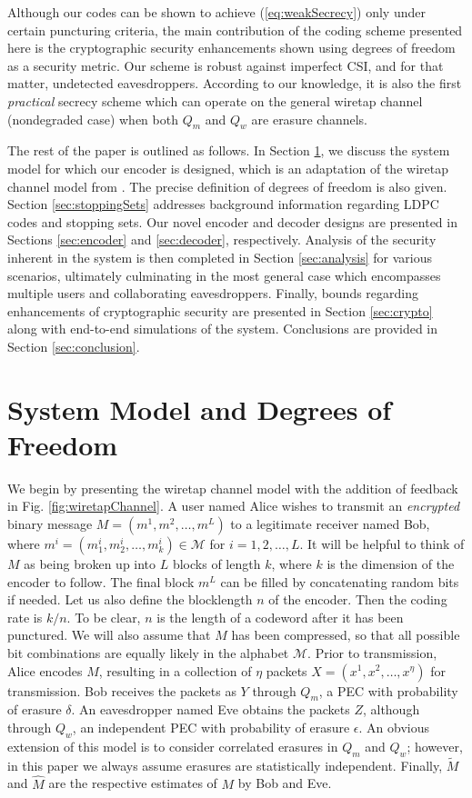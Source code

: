 \documentclass[10pt,twocolumn,twoside]{IEEEtran} \newlength{\pic}
\theoremstyle{definition}
\theoremstyle{remark}
\theoremstyle{plain}
\begin{document}
Although our codes can be shown to achieve (\ref{eq:weakSecrecy}) only under certain puncturing criteria, the main contribution of the coding scheme presented here is the cryptographic security enhancements shown using degrees of freedom as a security metric. Our scheme is robust against imperfect CSI, and for that matter, undetected eavesdroppers. According to our knowledge, it is also the first \emph{practical} secrecy scheme which can operate on the general wiretap channel (nondegraded case) when both $Q_m$ and $Q_w$ are erasure channels.

The rest of the paper is outlined as follows. In Section \ref{sec:system}, we discuss the system model for which our encoder is designed, which is an adaptation of the wiretap channel model from \cite{Wyner75}. The precise definition of degrees of freedom is also given. Section \ref{sec:stoppingSets} addresses background information regarding LDPC codes and stopping sets. Our novel encoder and decoder designs are presented in Sections \ref{sec:encoder} and \ref{sec:decoder}, respectively. Analysis of the security inherent in the system is then completed in Section \ref{sec:analysis} for various scenarios, ultimately culminating in the most general case which encompasses multiple users and collaborating eavesdroppers. Finally, bounds regarding enhancements of cryptographic security are presented in Section \ref{sec:crypto} along with end-to-end simulations of the system. Conclusions are provided in Section \ref{sec:conclusion}.

\section{System Model and Degrees of Freedom}\label{sec:system}

We begin by presenting the wiretap channel model \cite{BlochBook} with the addition of feedback in Fig. \ref{fig:wiretapChannel}. A user named Alice wishes to transmit an \emph{encrypted} binary message $M = (m^1, m^2, \ldots, m^L)$ to a legitimate receiver named Bob, where $m^i = (m_1^i, m_2^i, \ldots, m_k^i) \in \mathcal{M}$ for $i = 1,2,\ldots,L$. It will be helpful to think of $M$ as being broken up into $L$ blocks of length $k$, where $k$ is the dimension of the encoder to follow. The final block $m^L$ can be filled by concatenating random bits if needed. Let us also define the blocklength $n$ of the encoder. Then the coding rate is $k/n$. To be clear, $n$ is the length of a codeword after it has been punctured. We will also assume that $M$ has been compressed, so that all possible bit combinations are equally likely in the alphabet $\mathcal{M}$. Prior to transmission, Alice encodes $M$, resulting in a collection of $\eta$ packets $X = (x^1, x^2, \ldots, x^\eta)$ for transmission. Bob receives the packets as $Y$ through $Q_m$, a PEC with probability of erasure $\delta$. An eavesdropper named Eve obtains the packets $Z$, although through $Q_w$, an independent PEC with probability of erasure $\epsilon$. An obvious extension of this model is to consider correlated erasures in $Q_m$ and $Q_w$; however, in this paper we always assume erasures are statistically independent. Finally, $\tilde{M}$ and $\hat{M}$ are the respective estimates of $M$ by Bob and Eve.
\end{document}
